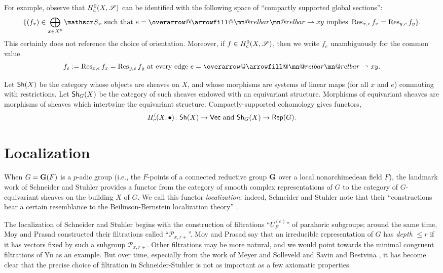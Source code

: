 \documentclass[letter]{amsart}
\makeatletter
\theoremstyle{definition}
\theoremstyle{remark}
\numberwithin{thm}{section}
\numberwithin{equation}{section}
\DeclareRobustCommand{\overrightharpoon}{\mathpalette{\overarrow@\rightharpoonfill@}}
\def\rightharpoonfill@{\arrowfill@\mn@relbar\mn@relbar\rightharpoonup}
\newcommand{\edge}[1]{\overrightharpoon{#1}}
\makeatother
\begin{document}
For example, observe that $H_c^0(X, {\mathscr{S}})$ can be identified with the following space of ``compactly supported global sections'':
$$\{ (f_x) \in \bigoplus_{x \in X^0} \sheaf{S}_x  \text{ such that } e = \edge{xy} \text{ implies } \Res_{x,e} f_x = \Res_{y,e} f_y \}.$$
This certainly does not reference the choice of orientation.  Moreover, if $f \in H_c^0(X, {\mathscr{S}})$, then we write $f_e$ unambiguously for the common value
$$f_e :=  \Res_{x,e} f_x = \Res_{y,e} f_y  \text{ at every edge } e = \edge{xy}.$$

Let ${\mathsf{Sh}}(X)$ be the category whose objects are sheaves on $X$, and whose morphisms are systems of linear maps (for all $x$ and $e$) commuting with restrictions.  Let ${\mathsf{Sh}}_G(X)$ be the category of such sheaves endowed with an equivariant structure.  Morphisms of equivariant sheaves are morphisms of sheaves which intertwine the equivariant structure.  Compactly-supported cohomology gives functors,
$$H_c^i(X, \bullet) \colon {\mathsf{Sh}}(X) \rightarrow {\mathsf{Vec}} \text{ and } {\mathsf{Sh}}_G(X) \rightarrow {\mathsf{Rep}}(G).$$

\section{Localization}

When $G = \boldsymbol{\mathrm{G}}(F)$ is a $p$-adic group (i.e., the $F$-points of a connected reductive group $\boldsymbol{\mathrm{G}}$ over a local nonarchimedean field $F$), the landmark work of Schneider and Stuhler \cite[\S III.1]{SS} provides a functor from the category of smooth complex representations of $G$ to the category of $G$-equivariant sheaves on the building $X$ of $G$.  We call this functor {\em localization}; indeed, Schneider and Stuhler note that their ``constructions bear a certain resemblance to the Beilinson-Bernstein localization theory'' \cite[Intr., p.100]{SS}.  

The localization of Schneider and Stuhler begins with the construction of filtrations ``$U_F^{(e)}$'' of parahoric subgroups; around the same time, Moy and Prasad \cite{MP1} constructed their filtrations called ``${\mathcal P}_{x,r+}$''.  Moy and Prasad say that an irreducible representation of $G$ has {\em depth} $\leq r$ if it has vectors fixed by such a subgroup ${\mathcal P}_{x,r+}$.  Other filtrations may be more natural, and we would point towards the minimal congruent filtrations of Yu \cite{YuSmoothModels} as an example.  But over time, especially from the work of Meyer and Solleveld \cite{MS} and Savin and Bestvina \cite{BS},  it has become clear that the precise choice of filtration in Schneider-Stuhler is not as important as a few axiomatic properties.  
\end{document}
